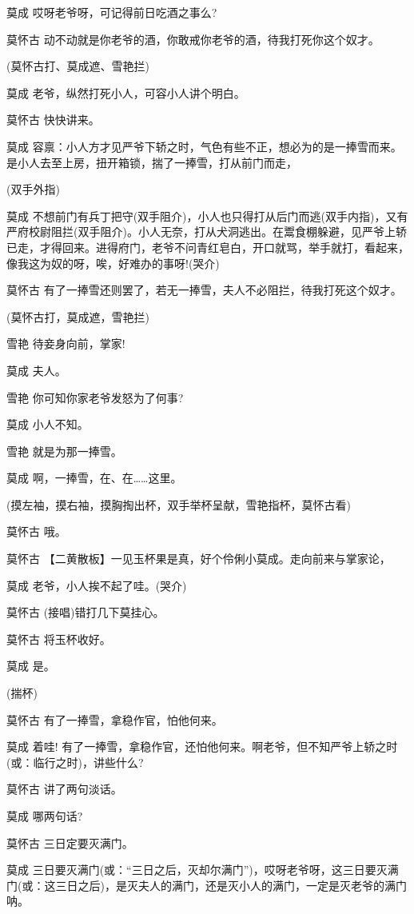 莫成 哎呀老爷呀，可记得前日吃酒之事么?

莫怀古 动不动就是你老爷的酒，你敢戒你老爷的酒，待我打死你这个奴才。

(莫怀古打、莫成遮、雪艳拦)

莫成 老爷，纵然打死小人，可容小人讲个明白。

莫怀古 快快讲来。

莫成
容禀：小人方才见严爷下轿之时，气色有些不正，想必为的是一捧雪而来。是小人去至上房，扭开箱锁，揣了一捧雪，打从前门而走，

(双手外指)

莫成
不想前门有兵丁把守(双手阻介)，小人也只得打从后门而逃(双手内指)，又有严府校尉阻拦(双手阻介)。小人无奈，打从犬洞逃出。在鬻食棚躲避，见严爷上轿已走，才得回来。进得府门，老爷不问青红皂白，开口就骂，举手就打，看起来，像我这为奴的呀，唉，好难办的事呀!(哭介)

莫怀古 有了一捧雪还则罢了，若无一捧雪，夫人不必阻拦，待我打死这个奴才。

(莫怀古打，莫成遮，雪艳拦)

雪艳 待妾身向前，掌家!

莫成 夫人。

雪艳 你可知你家老爷发怒为了何事?

莫成 小人不知。

雪艳 就是为那一捧雪。

莫成 啊，一捧雪，在、在\ldots{}\ldots{}这里。

(摸左袖，摸右袖，摸胸掏出杯，双手举杯呈献，雪艳指杯，莫怀古看)

莫怀古 哦。

莫怀古 【二黄散板】一见玉杯果是真，好个伶俐小莫成。走向前来与掌家论，

莫成 老爷，小人挨不起了哇。(哭介)

莫怀古 (接唱)错打几下莫挂心。

莫怀古 将玉杯收好。

莫成 是。

(揣杯)

莫怀古 有了一捧雪，拿稳作官，怕他何来。

莫成 着哇!
有了一捧雪，拿稳作官，还怕他何来。啊老爷，但不知严爷上轿之时(或：临行之时)，讲些什么?

莫怀古 讲了两句淡话。

莫成 哪两句话?

莫怀古 三日定要灭满门。

莫成
三日要灭满门(或：``三日之后，灭却尔满门'')，哎呀老爷呀，这三日要灭满门(或：这三日之后)，是灭夫人的满门，还是灭小人的满门，一定是灭老爷的满门呐。

